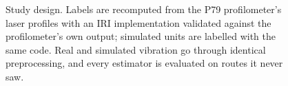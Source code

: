 \begin{figure}[t]
\caption{Study design. Labels are recomputed from the P79 profilometer's laser profiles with an IRI implementation validated against the profilometer's own output; simulated units are labelled with the same code. Real and simulated vibration go through identical preprocessing, and every estimator is evaluated on routes it never saw.}
\label{fig:pipeline}
\end{figure}
